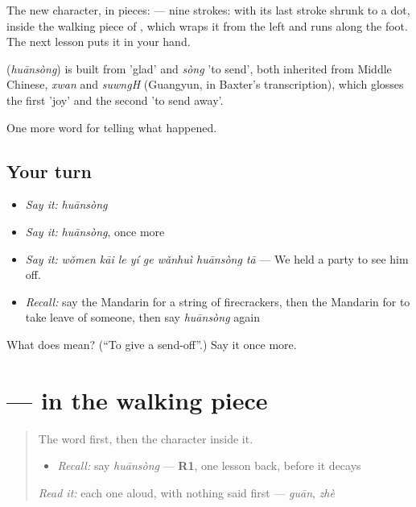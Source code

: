 The new character, in pieces:  — nine strokes:  with its last stroke shrunk to a dot, inside the walking piece of , which wraps it from the left and runs along the foot. The next lesson puts it in your hand.

\begin{cousinweb}
\textbf{} (\emph{huānsòng}) is built from  'glad' and \emph{sòng} 'to send', both inherited from Middle Chinese, \emph{xwan} and \emph{suwngH} (Guangyun, in Baxter's transcription), which glosses the first 'joy' and the second 'to send away'.
\end{cousinweb}

\begin{grammarlens}[title={What you've built}]
One more word for telling what happened.
\end{grammarlens}

\subsection*{Your turn}
\begin{itemize}
\raggedright
  \item \emph{Say it:} \emph{huānsòng}
  \item \emph{Say it:} \emph{huānsòng}, once more
  \item \emph{Say it:} \emph{wǒmen kāi le yí ge wǎnhuì huānsòng tā} — We held a party to see him off.
  \item \emph{Recall:} say the Mandarin for a string of firecrackers, then the Mandarin for to take leave of someone, then say \emph{huānsòng} again
\end{itemize}

\begin{tcolorbox}[breakable,colback=teal!4,colframe=teal!35!black,title={Before you move on}]
What does  mean? (\textquotedblleft{}To give a send-off\textquotedblright{}.) Say it once more.
\end{tcolorbox}
\section[\texorpdfstring{\zh{送} (sòng)}{送 (sòng)}]{ —  in the walking piece}

\label{lesson:ZH-W336-song-send}



\begin{quote}
The word first, then the character inside it.

\begin{itemize}
\raggedright
  \item \emph{Recall:} say \emph{huānsòng} — \textbf{R1}, one lesson back, before it decays
\end{itemize}

\begin{quote}
 
\end{quote}

\emph{Read it:} each one aloud, with nothing said first — \emph{guān}, \emph{zhè}
\end{quote}


